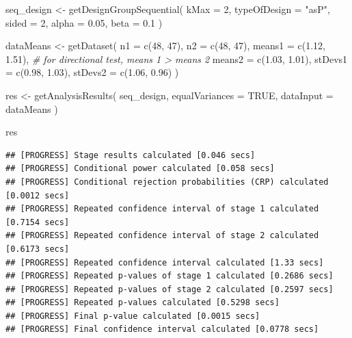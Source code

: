 \documentclass[
  oneside]{krantz}
\makeatletter
\newenvironment{Shaded}{\begin{snugshade}}{\end{snugshade}}
\newcommand{\AttributeTok}[1]{\textcolor[rgb]{0.61,0.61,0.61}{#1}}
\newcommand{\CommentTok}[1]{\textcolor[rgb]{0.37,0.37,0.37}{\textit{#1}}}
\newcommand{\ConstantTok}[1]{\textcolor[rgb]{0,0,0}{#1}}
\newcommand{\DecValTok}[1]{\textcolor[rgb]{0.06,0.06,0.06}{#1}}
\newcommand{\FloatTok}[1]{\textcolor[rgb]{0.06,0.06,0.06}{#1}}
\newcommand{\FunctionTok}[1]{\textcolor[rgb]{0,0,0}{#1}}
\newcommand{\NormalTok}[1]{#1}
\newcommand{\OtherTok}[1]{\textcolor[rgb]{0.37,0.37,0.37}{#1}}
\newcommand{\StringTok}[1]{\textcolor[rgb]{0.5,0.5,0.5}{#1}}
\newenvironment{kframe}{%
\medskip{}
\setlength{\fboxsep}{.8em}
 \def\at@end@of@kframe{}%
 \ifinner\ifhmode%
  \def\at@end@of@kframe{\end{minipage}}%
  \begin{minipage}{\columnwidth}%
 \fi\fi%
 \def\FrameCommand##1{\hskip\@totalleftmargin \hskip-\fboxsep
 \colorbox{shadecolor}{##1}\hskip-\fboxsep
     \hskip-\linewidth \hskip-\@totalleftmargin \hskip\columnwidth}%
 \MakeFramed {\advance\hsize-\width
   \@totalleftmargin\z@ \linewidth\hsize
   \@setminipage}}%
 {\par\unskip\endMakeFramed%
 \at@end@of@kframe}
\renewenvironment{Shaded}{\begin{kframe}}{\end{kframe}}
\makeatother
\begin{document}
\begin{Shaded}
\begin{Highlighting}[]
\NormalTok{seq\_design }\OtherTok{\textless{}{-}} \FunctionTok{getDesignGroupSequential}\NormalTok{(}
  \AttributeTok{kMax =} \DecValTok{2}\NormalTok{,}
  \AttributeTok{typeOfDesign =} \StringTok{"asP"}\NormalTok{,}
  \AttributeTok{sided =} \DecValTok{2}\NormalTok{,}
  \AttributeTok{alpha =} \FloatTok{0.05}\NormalTok{,}
  \AttributeTok{beta =} \FloatTok{0.1}
\NormalTok{)}

\NormalTok{dataMeans }\OtherTok{\textless{}{-}} \FunctionTok{getDataset}\NormalTok{(}
  \AttributeTok{n1 =} \FunctionTok{c}\NormalTok{(}\DecValTok{48}\NormalTok{, }\DecValTok{47}\NormalTok{), }
  \AttributeTok{n2 =} \FunctionTok{c}\NormalTok{(}\DecValTok{48}\NormalTok{, }\DecValTok{47}\NormalTok{), }
  \AttributeTok{means1 =} \FunctionTok{c}\NormalTok{(}\FloatTok{1.12}\NormalTok{, }\FloatTok{1.51}\NormalTok{), }\CommentTok{\# for directional test, means 1 \textgreater{} means 2}
  \AttributeTok{means2 =} \FunctionTok{c}\NormalTok{(}\FloatTok{1.03}\NormalTok{, }\FloatTok{1.01}\NormalTok{),}
  \AttributeTok{stDevs1 =} \FunctionTok{c}\NormalTok{(}\FloatTok{0.98}\NormalTok{, }\FloatTok{1.03}\NormalTok{), }
  \AttributeTok{stDevs2 =} \FunctionTok{c}\NormalTok{(}\FloatTok{1.06}\NormalTok{, }\FloatTok{0.96}\NormalTok{)}
\NormalTok{  )}

\NormalTok{res }\OtherTok{\textless{}{-}} \FunctionTok{getAnalysisResults}\NormalTok{(}
\NormalTok{  seq\_design, }
  \AttributeTok{equalVariances =} \ConstantTok{TRUE}\NormalTok{,}
  \AttributeTok{dataInput =}\NormalTok{ dataMeans}
\NormalTok{  )}

\NormalTok{res}
\end{Highlighting}
\end{Shaded}

\begin{verbatim}
## [PROGRESS] Stage results calculated [0.046 secs] 
## [PROGRESS] Conditional power calculated [0.058 secs] 
## [PROGRESS] Conditional rejection probabilities (CRP) calculated [0.0012 secs] 
## [PROGRESS] Repeated confidence interval of stage 1 calculated [0.7154 secs] 
## [PROGRESS] Repeated confidence interval of stage 2 calculated [0.6173 secs] 
## [PROGRESS] Repeated confidence interval calculated [1.33 secs] 
## [PROGRESS] Repeated p-values of stage 1 calculated [0.2686 secs] 
## [PROGRESS] Repeated p-values of stage 2 calculated [0.2597 secs] 
## [PROGRESS] Repeated p-values calculated [0.5298 secs] 
## [PROGRESS] Final p-value calculated [0.0015 secs] 
## [PROGRESS] Final confidence interval calculated [0.0778 secs]
\end{verbatim}
\end{document}
